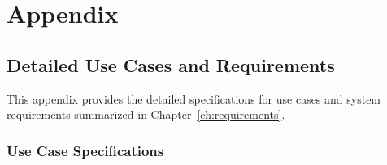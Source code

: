 \chapter{Appendix}
\label{app:appendix}

\section{Detailed Use Cases and Requirements}
\label{app:requirements}

This appendix provides the detailed specifications for use cases and system requirements summarized in Chapter~\ref{ch:requirements}.


\subsection{Use Case Specifications}
\label{app:usecases}
